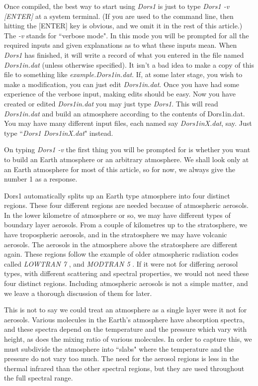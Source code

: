 \documentclass[12pt]{article}
\begin{document}
Once compiled, the best way to start using {\it Dors1} is just to type {\it Dors1 -v [ENTER]} at a system terminal.
(If you are used to the command line, then hitting the [ENTER] key is obvious, and we omit
it in the rest of this article.)
The { \it -v} stands for ``verbose mode".
 In this mode you will be prompted for all the required
inputs and given explanations as to what these inputs mean. When {\it Dors1} has finished, it will write a record of what you entered 
 in the file named  {\it Dors1in.dat} (unless otherwise specified).  It isn't a bad idea to make a copy of this file to something 
like {\it example.Dors1in.dat}.
If, at some later stage, you wish to make a modification, you can just edit 
{\it Dors1in.dat}. Once you have had some experience of the verbose input, making edits should be
easy.
Now you have created or edited {\it Dors1in.dat}
 you may just type {\it Dors1}. This will read {\it Dors1in.dat} and build an 
atmosphere according to the contents of {Dors1in.dat}. You may have many different input files, each named say {\it Dors1inX.dat}, say. Just type
``{\it Dors1 Dors1inX.dat}" instead. 

On typing {\it Dors1 -v} the first thing you will be prompted for is whether you want to build
an Earth atmosphere or an arbitrary atmosphere. We shall look only at an Earth atmosphere
for most of this article, so for now, we always give the number 1 as a response. 

Dors1 automatically splits up an Earth type atmosphere into four distinct regions.
These four different regions are needed because of atmospheric aerosols. In the lower
kilometre of atmosphere or so, we may have different types of boundary layer
aerosols. From a couple of kilometres
up to the stratosphere, we have tropospheric aerosols, and in the stratosphere we may have
volcanic aerosols. The aerosols in the atmosphere above the stratosphere are different again.
These regions follow the example of older atmospheric radiation codes called {\it LOWTRAN 7}
\cite{LOWTRAN:Mybib}, and  {\it MODTRAN 5} \cite{MODTRAN:Mybib}.
If it were not for differing aerosol types, with different scattering and spectral properties,
we would not need these four distinct regions. Including atmospheric aerosols is not a simple
matter, and we leave a thorough discussion of them for later.

This is not to say we could treat  an atmosphere as a single layer were it not for aerosols.
Various molecules in the Earth's atmosphere have absorption spectra, and these spectra
depend on the temperature and the pressure which vary with height, as does the mixing ratio
of various molecules.
In order to capture this, we must subdivide the atmosphere into ``slabs" where the temperature and
the pressure do not vary too much. The need for the aerosol regions is less in the thermal infrared
than the other spectral regions, but they are used throughout the full spectral range. 
\end{document}
